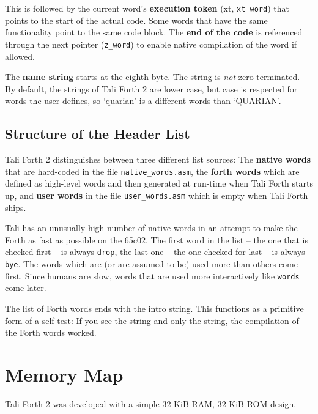 This is followed by the current word's \textbf{execution token} (xt,
\texttt{xt\_word}) that points to the start of the actual code. Some words that
have the same functionality point to the same code block. The \textbf{end of the
code} is referenced through the next pointer (\texttt{z\_word}) to enable native
compilation of the word if allowed. 

The \textbf{name string} starts at the eighth byte. The string is \textit{not}
zero-terminated. By default, the strings of Tali Forth 2 are lower case, but
case is respected for words the user defines, so `quarian' is a different words
than `QUARIAN'. 


\subsection{Structure of the Header List}

Tali Forth 2 distinguishes between three different list sources: The
\textbf{native words} that are hard-coded in the file
\texttt{native\_words.asm}, the \textbf{forth words} which are defined as
high-level words and then generated at run-time when Tali Forth starts up, and
\textbf{user words} in the file \texttt{user\_words.asm} which is empty when
Tali Forth ships. 

Tali has an unusually high number of native words in an attempt to make the
Forth as fast as possible on the 65c02. The first word in the list -- the one
that is checked first -- is always \texttt{drop}, the last one -- the one
checked for last -- is always \texttt{bye}. The words which are (or are assumed
to be) used more than others come first. Since humans are slow, words that are
used more interactively like \texttt{words} come later. 

The list of Forth words ends with the intro string. This functions as a
primitive form of a self-test: If you see the string and only the string, the
compilation of the Forth words worked.


\section{Memory Map}


Tali Forth 2 was developed with a simple 32 KiB RAM, 32 KiB ROM design. 

